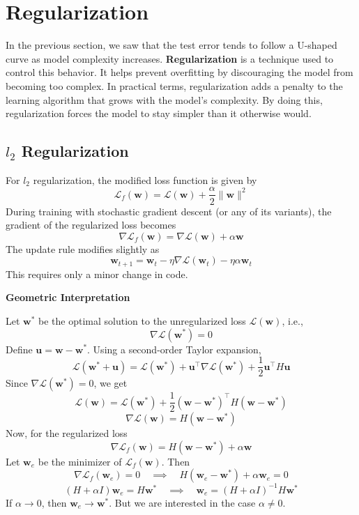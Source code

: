 \section{Regularization}

In the previous section, we saw that the test error tends to follow a U-shaped curve as model complexity increases. \textbf{Regularization} is a technique used to control this behavior. It helps prevent overfitting by discouraging the model from becoming too complex. In practical terms, regularization adds a penalty to the learning algorithm that grows with the model's complexity. By doing this, regularization forces the model to stay simpler than it otherwise would. 

\subsection{\(l_2\) Regularization}

For $l_2$ regularization, the modified loss function is given by 
\[
\mathcal{L}_f(\mathbf{w}) = \mathcal{L}(\mathbf{w}) + \frac{\alpha}{2} \|\mathbf{w}\|^2
\]
During training with stochastic gradient descent (or any of its variants), the gradient of the regularized loss becomes 
\[
\nabla \mathcal{L}_f(\mathbf{w}) = \nabla \mathcal{L}(\mathbf{w}) + \alpha \mathbf{w}
\]
The update rule modifies slightly as 
\[
\mathbf{w}_{t+1} = \mathbf{w}_t - \eta \nabla \mathcal{L}(\mathbf{w}_t) - \eta \alpha \mathbf{w}_t
\]
This requires only a minor change in code.

\vspace{1em}
\textbf{Geometric Interpretation}

Let \( \mathbf{w}^* \) be the optimal solution to the unregularized loss \( \mathcal{L}(\mathbf{w}) \), i.e.,
\[
\nabla \mathcal{L}(\mathbf{w}^*) = 0
\]
Define \( \mathbf{u} = \mathbf{w} - \mathbf{w}^* \). Using a second-order Taylor expansion,
\[
\mathcal{L}(\mathbf{w}^* + \mathbf{u}) = \mathcal{L}(\mathbf{w}^*) + \mathbf{u}^\top \nabla \mathcal{L}(\mathbf{w}^*) + \frac{1}{2} \mathbf{u}^\top H \mathbf{u}
\]
Since \( \nabla \mathcal{L}(\mathbf{w}^*) = 0 \), we get
\[
\mathcal{L}(\mathbf{w}) = \mathcal{L}(\mathbf{w}^*) + \frac{1}{2} (\mathbf{w} - \mathbf{w}^*)^\top H (\mathbf{w} - \mathbf{w}^*)
\]
\[
\nabla \mathcal{L}(\mathbf{w}) = H(\mathbf{w} - \mathbf{w}^*)
\]
Now, for the regularized loss
\[
\nabla \mathcal{L}_f(\mathbf{w}) = H(\mathbf{w} - \mathbf{w}^*) + \alpha \mathbf{w}
\]
Let \( \mathbf{w}_e \) be the minimizer of \( \mathcal{L}_f(\mathbf{w}) \). Then
\[
\nabla \mathcal{L}_f(\mathbf{w}_e) = 0 \quad \implies \quad H(\mathbf{w}_e - \mathbf{w}^*) + \alpha \mathbf{w}_e = 0
\]
\[
(H + \alpha I) \mathbf{w}_e = H \mathbf{w}^* \quad
\implies \quad
\mathbf{w}_e = (H + \alpha I)^{-1} H \mathbf{w}^*
\]
If \( \alpha \to 0 \), then \( \mathbf{w}_e \to \mathbf{w}^* \). But we are interested in the case \( \alpha \neq 0 \).

